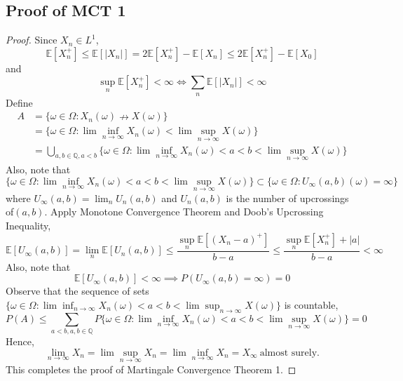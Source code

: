 \documentclass[10pt]{article}
\begin{document}
\subsection{Proof of MCT 1}

\begin{proof}
Since $X_n \in L^1$, 
$$\mathbb{E}[X_n^+]\le \mathbb{E}[|X_n|]=2\mathbb{E}[X_n^+]-\mathbb{E}[X_n]\le 2\mathbb{E}[X_n^+]-\mathbb{E}[X_0]$$ and $$\sup_{n}\mathbb{E}[X_n^{+}]<\infty \iff \sum_{n}\mathbb{E}[|X_n|]<\infty$$
Define \begin{align*}
    A &=\{\omega \in \Omega: X_n(\omega)\nrightarrow X(\omega)\}\\&=\{\omega \in \Omega: \lim \inf_{n \to \infty}X_n(\omega)<\lim \sup_{n\to \infty}X(\omega)\}\\&=\bigcup_{a,b\in \mathbb{Q},a<b}\{\omega \in \Omega: \lim \inf_{n \to \infty}X_n(\omega)<a<b<\lim \sup_{n\to \infty}X(\omega)\}
\end{align*}
Also, note that $$\{\omega \in \Omega: \lim \inf_{n \to \infty}X_n(\omega)<a<b<\lim \sup_{n\to \infty}X(\omega)\}\subset\{\omega \in \Omega: U_{\infty}(a,b)(\omega)=\infty\}$$ where $U_{\infty}(a,b)=\lim_n U_n(a,b)$ and $U_n(a,b)$ is the number of upcrossings of$(a,b)$. Apply Monotone Convergence Theorem and Doob’s Upcrossing Inequality, 
$$\mathbb{E}[U_{\infty}(a,b)]=\lim_{n}\mathbb{E}[U_n(a,b)]\le \frac{\sup_n \mathbb{E}[(X_n-a)^{+}]}{b-a}\le \frac{\sup_n \mathbb{E}[X_n^+]+|a|}{b-a}<\infty$$ Also, note that $$\mathbb{E}[U_{\infty}(a,b)]<\infty \implies P(U_{\infty}(a,b)=\infty)=0$$ Observe that the sequence of  sets $\{\omega \in \Omega: \lim \inf_{n \to \infty}X_n(\omega)<a<b<\lim \sup_{n\to \infty}X(\omega)\}$ is countable, $$P(A)\le \sum_{a<b, a,b\in \mathbb{Q}}P\{\omega \in \Omega: \lim \inf_{n \to \infty}X_n(\omega)<a<b<\lim \sup_{n\to \infty}X(\omega)\}=0$$Hence, $$\lim_{n \to \infty}X_n=\lim \sup_{n \to \infty}X_n=\lim \inf_{n \to \infty}X_n=X_{\infty} \ \text{almost surely}.$$ This completes the proof of Martingale Convergence Theorem 1.\end{proof}
\end{document}
